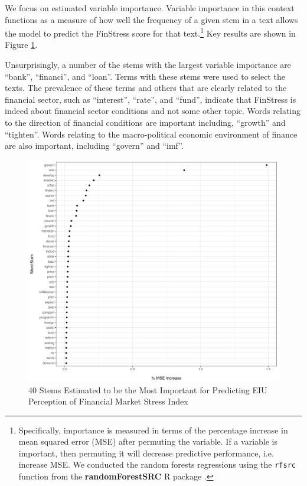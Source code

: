 \documentclass[]{article}
\begin{document}
We focus on estimated variable importance. Variable importance in this context functions as a measure of how well the frequency of a given stem in a text allows the model to predict the FinStress score for that text.\footnote{Specifically, importance is measured in terms of the percentage increase in mean squared error (MSE) after permuting the variable. If a variable is important, then permuting it will decrease predictive performance, i.e. increase MSE. We conducted the random forests regressions using the \texttt{rfsrc} function from the \textbf{randomForestSRC} R package \citep{randomForestSRCCite}.} Key results are shown in Figure \ref{rf_importance}.

Unsurprisingly, a number of the stems with the largest variable importance are ``bank'', ``financi'', and ``loan''. Terms with these stems were used to select the texts. The prevalence of these terms and others that are clearly related to the financial sector, such as ``interest'', ``rate'', and ``fund'', indicate that FinStress is indeed about financial sector conditions and not some other topic. Words relating to the direction of financial conditions are important including, ``growth'' and ``tighten''. Words relating to the macro-political economic environment of finance are also important, including ``govern'' and ``imf''.

\begin{figure}
    \caption{40 Stems Estimated to be the Most Important for Predicting EIU Perception of Financial Market Stress Index}
    \label{rf_importance}

    \begin{center}
        \includegraphics[scale=0.5]{figures/rf_stem_importance.pdf}
    \end{center}

\end{figure}
\end{document}
